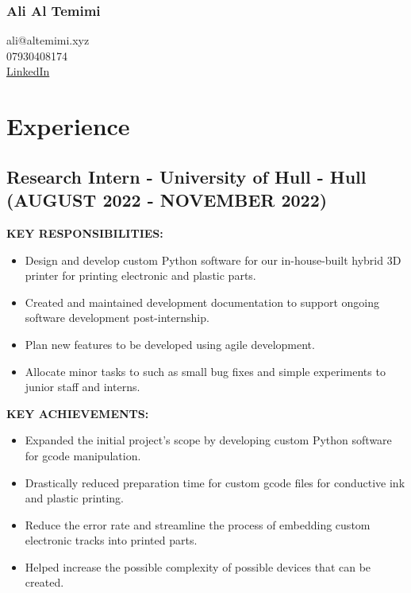 \documentclass{article}
\begin{document}
\begin{multicols}{2}
    \subsubsection{Ali Al Temimi}
    \columnbreak
    \Large\raggedleft ali@altemimi.xyz \\ 07930408174 \\ \href{https://www.linkedin.com/in/ali-al-temimi-8995b4196/}{LinkedIn}
    \noindent
\end{multicols}

\section{Experience}
\subsection{Research Intern - \textnormal{University of Hull - Hull} \footnotesize{(AUGUST 2022 - NOVEMBER 2022)}}
\begin{minipage}[t]{1\textwidth}
    \footnotesize{\textbf{KEY RESPONSIBILITIES:}}
    \normalsize{}
    \begin{itemize}[leftmargin=*]
        \item Design and develop custom Python software for our in-house-built hybrid 3D printer for printing electronic and plastic parts. 
        \item Created and maintained development documentation to support ongoing software development post-internship.
        \item Plan new features to be developed using agile development.
        \item Allocate minor tasks to such as small bug fixes and simple experiments to junior staff and interns. 
    \end{itemize}
\end{minipage}
\begin{minipage}[t]{1\textwidth}
    \vspace{1em}
    \footnotesize{\textbf{KEY ACHIEVEMENTS:}}
    \normalsize{}
    \begin{itemize}[leftmargin=*]
        \item Expanded the initial project’s scope by developing custom Python software for gcode manipulation.
        \item Drastically reduced preparation time for custom gcode files for conductive ink and plastic printing.
        \item Reduce the error rate and streamline the process of embedding custom electronic tracks into printed parts. 
        \item Helped increase the possible complexity of possible devices that can be created.  
    \end{itemize}
\end{minipage}
\end{document}
